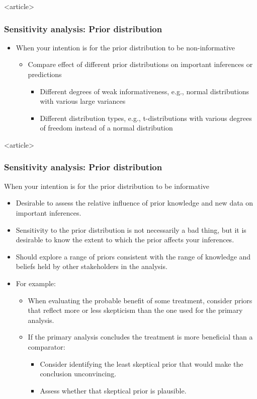 \documentclass{beamer}
\begin{document}
\begin{frame}<article>
  \frametitle{Sensitivity analysis: Prior distribution}
  
  \begin{itemize}
  \item When your intention is for the prior distribution to be
    non-informative
    \begin{itemize}
    \item Compare effect of different prior distributions on important
      inferences or predictions
      \begin{itemize}
      \item Different degrees of weak informativeness, e.g., normal
        distributions with various large variances
      \item Different distribution types, e.g., t-distributions with
        various degrees of freedom instead of a normal distribution
      \end{itemize}
    \end{itemize}
  \end{itemize}

\end{frame}

\begin{frame}<article>
  \frametitle{Sensitivity analysis: Prior distribution}
  
  When your intention is for the prior distribution to be informative
  \begin{itemize}
  \item Desirable to assess the relative influence of prior knowledge
    and new data on important inferences.
  \item Sensitivity to the prior distribution is not necessarily a bad
    thing, but it is desirable to know the extent to which the prior
    affects your inferences.
  \item Should explore a range of priors consistent with the range of
    knowledge and beliefs held by other stakeholders in the analysis.
  \item For example:
    \begin{itemize}
    \item When evaluating the probable benefit of some treatment,
      consider priors that reflect more or less skepticism than the
      one used for the primary analysis.
    \item If the primary analysis concludes the treatment is more
      beneficial than a comparator:
      \begin{itemize}
      \item Consider identifying the least skeptical prior that would
        make the conclusion unconvincing.
      \item Assess whether that skeptical prior is plausible.
      \end{itemize}
    \end{itemize}
  \end{itemize}

\end{frame}
\end{document}
